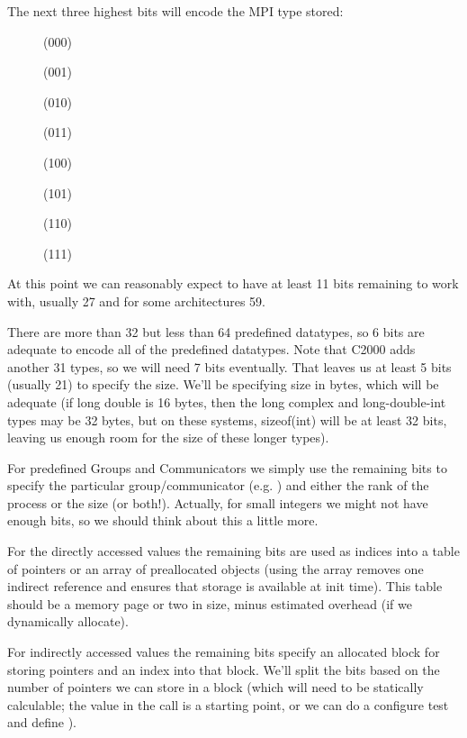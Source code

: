 \documentclass{article}
\begin{document}
The next three highest bits will encode the MPI type stored:
\begin{description}
\item[]     (000)
\item[]    (001)
\item[] (010)
\item[]     (011)
\item[](100)
\item[]       (101)
\item[]     (110)
\item[]      (111)
\end{description}

At this point we can reasonably expect to have at least 11 bits remaining
to work with, usually 27 and for some architectures 59.

There are more than 32 but less than 64 predefined datatypes, so 6 bits are
adequate to encode all of the predefined datatypes.
Note that C2000 adds another 31 types, so we will need 7 bits eventually.
That leaves us at least 5 bits
(usually 21) to specify the size.  We'll be specifying size in bytes,
which will be adequate (if long double is 16 bytes, then the long complex and
long-double-int types may be 32 bytes, but on these systems, sizeof(int) will
be at least 32 bits, leaving us enough room for the size of these longer
types). 

For predefined Groups and Communicators we simply use the remaining bits
to specify the particular group/communicator (e.g. ) and 
either the rank of the process or the size (or both!).  Actually, for
small integers we  
might not have enough bits, so we should think about this a little more.

For the directly accessed values the remaining bits are used as indices into
a table of pointers or an array of preallocated objects (using the array
removes one indirect reference and ensures that storage is available at init
time).  This table should be 
a memory page or two in size, 
minus estimated  overhead (if we dynamically allocate).

For indirectly accessed values the remaining bits specify an allocated block
for storing pointers and an index into that block.  We'll split the bits
based on the number of pointers we can store in a block (which will need
to be statically calculable; the  value in the
 call is a starting point, or we can  do a configure test and
define ). 
\end{document}
